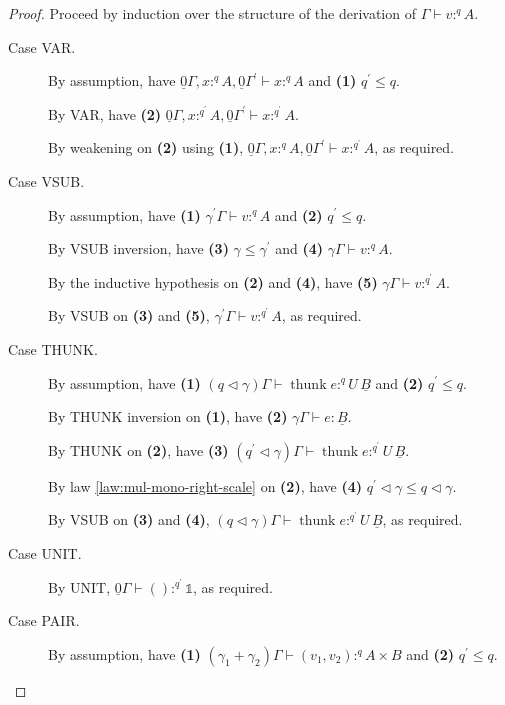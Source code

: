 \documentclass[acmsmall,screen,nonacm]{acmart}
\DeclareMathOperator{\thunk}{\text{thunk}}
\newcommand{\unit}{\mathbb{1}}
\newcommand{\tee}{\vdash}
\DeclareMathOperator{\scale}{\mathbin{\triangleleft}}
\begin{document}
\begin{proof}
  Proceed by induction over the structure of the derivation of $\Gamma \tee v :^q A$.
  \begin{description}
    \item[Case VAR.] 
    By assumption, have $\underline{0}\Gamma, x :^q A, \underline{0}\Gamma^\prime \tee x :^q A$ and \textbf{(1)} $q^\prime \le q$.

    By VAR, have \textbf{(2)} $\underline{0}\Gamma, x :^{q^\prime} A, \underline{0}\Gamma^\prime \tee x :^{q^\prime} A$.

    By weakening on \textbf{(2)} using \textbf{(1)}, $\underline{0}\Gamma, x :^q A, \underline{0}\Gamma^\prime \tee x :^{q^\prime} A$, as required.
    \\
    \item[Case VSUB.] 
    By assumption, have \textbf{(1)} $\gamma^\prime\Gamma \tee v :^q A$ and \textbf{(2)} $q^\prime \le q$.
    
    By VSUB inversion, have \textbf{(3)} $\gamma \le \gamma^\prime$ and \textbf{(4)} $\gamma\Gamma \tee v :^q A$.

    By the inductive hypothesis on \textbf{(2)} and \textbf{(4)}, have \textbf{(5)} $\gamma\Gamma \tee v :^{q^\prime} A$.

    By VSUB on \textbf{(3)} and \textbf{(5)}, $\gamma^\prime\Gamma \tee v :^{q^\prime} A$, as required.
    \\
    \item[Case THUNK.] 
    By assumption, have \textbf{(1)} $(q \scale \gamma)\Gamma \tee \thunk e :^q U \, \underline{B}$ and \textbf{(2)} $q^\prime \le q$.

    By THUNK inversion on \textbf{(1)}, have \textbf{(2)} $\gamma\Gamma \tee e : \underline{B}$.

    By THUNK on \textbf{(2)}, have \textbf{(3)} $(q^\prime \scale \gamma)\Gamma \tee \thunk e :^{q^\prime} U \, \underline{B}$.

    By law \ref{law:mul-mono-right-scale} on \textbf{(2)}, have \textbf{(4)} $q^\prime \scale \gamma \le q \scale \gamma$.

    By VSUB on \textbf{(3)} and \textbf{(4)}, $(q \scale \gamma)\Gamma \tee \thunk e :^{q^\prime} U \, \underline{B}$, as required.
    \\
    \item[Case UNIT.]
    By UNIT, $\underline{0}\Gamma \tee () :^{q^\prime} \unit$, as required.
    \\
    \item[Case PAIR.]
    By assumption, have \textbf{(1)} $(\gamma_1 + \gamma_2)\Gamma \tee (v_1, v_2) :^q A \times B$ and \textbf{(2)} $q^\prime \le q$.


\end{description}
\end{proof}
\end{document}
